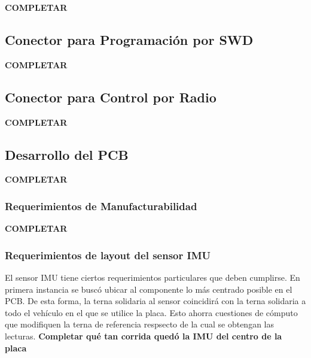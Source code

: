 \textbf{{\color{red} COMPLETAR}}

\subsection{Conector para Programación por SWD}

\textbf{{\color{red} COMPLETAR}}

\subsection{Conector para Control por Radio}

\textbf{{\color{red} COMPLETAR}}

\subsection{Desarrollo del PCB}

\textbf{{\color{red} COMPLETAR}}

\subsubsection{Requerimientos de Manufacturabilidad}

\textbf{{\color{red} COMPLETAR}}



\subsubsection{Requerimientos de layout del sensor IMU}

El sensor IMU tiene ciertos requerimientos particulares que deben cumplirse. En primera instancia se buscó ubicar al componente lo más centrado posible en el PCB. De esta forma, la terna solidaria al sensor coincidirá con la terna solidaria a todo el vehículo en el que se utilice la placa. Esto ahorra cuestiones de cómputo que modifiquen la terna de referencia respsecto de la cual se obtengan las lecturas. \textbf{{\color{red} Completar qué tan corrida quedó la IMU del centro de la placa}}\\


